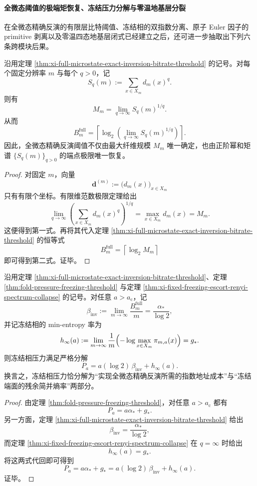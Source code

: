 \paragraph{全微态阈值的极端矩恢复、冻结压力分解与零温地基层分裂}
在全微态精确反演的有限层比特阈值、冻结相的双指数分离、原子 Euler 因子的 primitive 剥离以及零温四态地基层闭式已经建立之后，还可进一步抽取出下列六条跨模块后果。

\begin{corollary}[全可逆阈值的极端矩重建]\label{cor:xi-full-inversion-threshold-extreme-moment-recovery}
沿用定理 \ref{thm:xi-full-microstate-exact-inversion-bitrate-threshold} 的记号。对每个固定分辨率 \(m\) 与每个 \(q>0\)，记
\[
S_q(m):=\sum_{x\in X_m}d_m(x)^q.
\]
则有
\[
\boxed{\;
M_m=\lim_{q\to\infty}S_q(m)^{1/q}.\;}
\]
从而
\[
\boxed{\;
B_m^{\mathrm{full}}
=
\left\lceil
\log_2\!\left(\lim_{q\to\infty}S_q(m)^{1/q}\right)
\right\rceil.\;}
\]
因此，全微态精确反演阈值不仅由最大纤维规模 \(M_m\) 唯一确定，也由正阶幂和矩谱 \(\{S_q(m)\}_{q>0}\) 的端点极限唯一恢复。
\end{corollary}
\begin{proof}
对固定 \(m\)，向量
\[
\mathbf d^{(m)}:=\bigl(d_m(x)\bigr)_{x\in X_m}
\]
只有有限个坐标。有限维范数极限定理给出
\[
\lim_{q\to\infty}\left(\sum_{x\in X_m}d_m(x)^q\right)^{1/q}
=
\max_{x\in X_m}d_m(x)
=
M_m.
\]
这便得到第一式。再将其代入定理 \ref{thm:xi-full-microstate-exact-inversion-bitrate-threshold} 的恒等式
\[
B_m^{\mathrm{full}}=\left\lceil \log_2 M_m\right\rceil
\]
即可得到第二式。证毕。
\end{proof}

\begin{theorem}\label{thm:xi-fixed-freezing-pressure-address-cost-residual-decomposition}
沿用定理 \ref{thm:xi-full-microstate-exact-inversion-bitrate-threshold}、定理 \ref{thm:fold-pressure-freezing-threshold} 与定理 \ref{thm:xi-fixed-freezing-escort-renyi-spectrum-collapse} 的记号。对任意 \(a>a_{\mathrm c}\)，记
\[
\beta_{\mathrm{inv}}
:=
\lim_{m\to\infty}\frac{B_m^{\mathrm{full}}}{m}
=
\frac{\alpha_*}{\log 2},
\]
并记冻结相的 min-entropy 率为
\[
h_\infty(a)
:=
\lim_{m\to\infty}\frac{1}{m}
\Bigl(-\log\max_{x\in X_m}\pi_{m,a}(x)\Bigr)
=
g_*.
\]
则冻结相压力满足严格分解
\[
\boxed{\;
P_a
=
a(\log 2)\,\beta_{\mathrm{inv}}+h_\infty(a).\;}
\]
换言之，冻结相压力恰分解为“实现全微态精确反演所需的指数地址成本”与“冻结端面的残余简并熵率”两部分。
\end{theorem}
\begin{proof}
由定理 \ref{thm:fold-pressure-freezing-threshold}，对任意 \(a>a_{\mathrm c}\) 都有
\[
P_a=a\alpha_*+g_*.
\]
另一方面，定理 \ref{thm:xi-full-microstate-exact-inversion-bitrate-threshold} 给出
\[
\beta_{\mathrm{inv}}=\frac{\alpha_*}{\log 2},
\]
而定理 \ref{thm:xi-fixed-freezing-escort-renyi-spectrum-collapse} 在 \(q=\infty\) 时给出
\[
h_\infty(a)=g_*.
\]
将这两式代回即可得到
\[
P_a
=
a\alpha_*+g_*
=
a(\log 2)\,\beta_{\mathrm{inv}}+h_\infty(a).
\]
证毕。
\end{proof}

